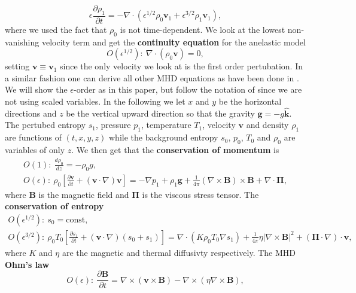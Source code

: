 \begin{equation}
    \epsilon\frac{\partial\rho_1}{\partial t} = -\nabla\cdot (\epsilon^{1/2}\rho_0\mathbf{v}_1+\epsilon^{3/2}\rho_1\mathbf{v}_1),
\end{equation}
where we used the fact that $\rho_0$ is not time-dependent. We look at the lowest non-vanishing velocity term and get the \textbf{continuity equation} for the anelastic model
\begin{equation}\label{eq:continuity}
    O(\epsilon^{1/2}):\ \nabla\cdot(\rho_0\mathbf{v})=0,
\end{equation}
setting $\mathbf{v}\equiv\mathbf{v}_1$ since the only velocity we look at is the first order pertubation. In a similar fashion one can derive all other MHD equations as have been done in \citep{1999ApJS..121..247L}. We will show the $\epsilon$-order as in this paper, but follow the notation of \citep{2021LRSP...18....5F} since we are not using scaled variables. In the following we let $x$ and $y$ be the horizontal directions and $z$ be the vertical upward direction so that the gravity $\mathbf{g}=-g\mathbf{\hat{k}}$. The pertubed entropy $s_1$, pressure $p_1$, temperature $T_1$, velocity $\mathbf{v}$ and density $\rho_1$ are functions of $(t,x,y,z)$ while the background entropy $s_0$, $p_0$, $T_0$ and $\rho_0$ are variables of only $z$. We then get that the \textbf{conservation of momentum} is
\begin{align}\label{eq:momentum}
    O(1):\ \frac{d\rho_0}{dz}=-\rho_0 g,\\
    O(\epsilon):\ \rho_0\left[\frac{\partial\mathbf{v}}{\partial t}+(\mathbf{v}\cdot\nabla)\mathbf{v}\right]=-\nabla p_1 + \rho_1\mathbf{g}+\frac{1}{4\pi}(\nabla\times\mathbf{B})\times\mathbf{B}+\nabla\cdot\mathbf{\Pi},
\end{align}
where $\mathbf{B}$ is the magnetic field and $\mathbf{\Pi}$ is the viscous stress tensor. The \textbf{conservation of entropy}
\begin{align}\label{eq:entropy_full}
    O(\epsilon^{1/2}):\ s_0=\text{const},\\
    O(\epsilon^{3/2}):\ \rho_0 T_0 \left[\frac{\partial s_1}{\partial t} + (\mathbf{v}\cdot \nabla)(s_0+s_1) \right]
    = \nabla\cdot(K\rho_0T_0\nabla s_1) + \frac{1}{4\pi}\eta \left| \nabla\times\mathbf{B} \right|^2+\left(\mathbf{\Pi}\cdot\nabla \right)\cdot\mathbf{v},
\end{align}
where $K$ and $\eta$ are the magnetic and thermal diffusivty respectively. The MHD \textbf{Ohm's law}
\begin{equation}\label{eq:ohms_law}
    O(\epsilon):\ \frac{\partial\mathbf{B}}{\partial t} = \nabla\times(\mathbf{v}\times\mathbf{B})-\nabla\times(\eta\nabla\times\mathbf{B}),
\end{equation}
